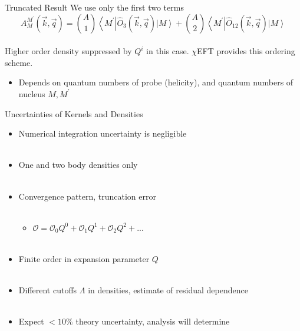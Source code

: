 \documentclass{beamer}
\newcommand{\bv}{\vec}
\begin{document}
\begin{frame}{Truncated Result}
We use only the first two terms
\begin{equation*}
    A_{M}^{M^{\prime} }(\bv{k}, \bv{q})=\binom{A}{1}\left\langle M^{\prime}\right|\hat{O}_{3}^{}(\bv{k}, \bv{q})\left|M\right \rangle + \binom{A}{2} \left\langle M^{\prime}\right|\hat{O}_{12}^{}(\bv{k}, \bv{q}) \left| M\right\rangle
\end{equation*}
~\\
Higher order density suppressed by $Q^i$ in this case. $\chi$EFT provides this ordering scheme.
\begin{itemize}
    \item Depends on quantum numbers of probe (helicity), and quantum numbers of nucleus $M, M^{'}  $\\
\end{itemize}
\end{frame}






\begin{frame}{Uncertainties of Kernels and Densities}
\begin{itemize}
    \item Numerical integration uncertainty is negligible \\~\\
    \item One and two body densities only\\~\\
    \item Convergence pattern, truncation error \\~\\
    \begin{itemize}
        \item $\mathcal{O}= \mathcal{O}_0 Q^0 +\mathcal{O}_1 Q^1+\mathcal{O}_2 Q^2+...$\\~\\
    \end{itemize}
    \item Finite order in expansion parameter $Q$\\~\\
    \item Different cutoffs $\Lambda$ in densities, estimate of residual dependence\\~\\
    \item Expect $<10\%$ theory uncertainty, analysis will determine
\end{itemize}

\end{frame}
\end{document}
